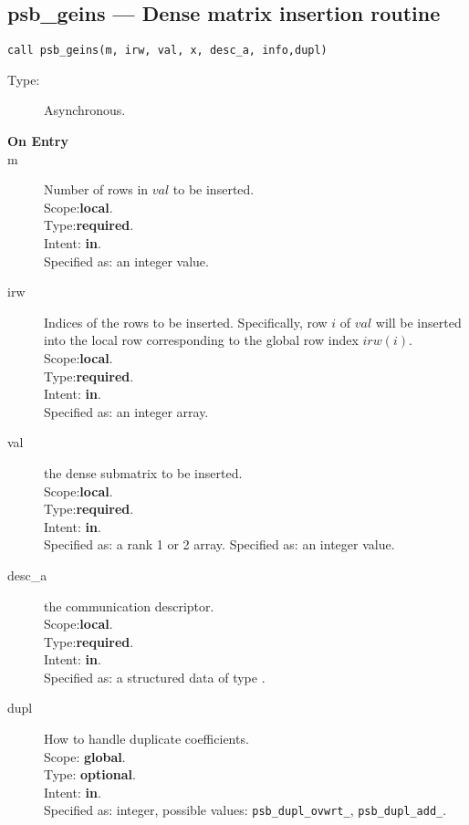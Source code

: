 %
%
\clearpage\subsection*{psb\_geins --- Dense matrix insertion routine}

\begin{verbatim}
call psb_geins(m, irw, val, x, desc_a, info,dupl)
\end{verbatim}

\begin{description}
\item[Type:] Asynchronous.
\item[\bf On Entry]
\item[m] Number of rows in $val$  to be inserted.\\
Scope:{\bf local}.\\
Type:{\bf required}.\\
Intent: {\bf in}.\\
Specified as: an integer value.
\item[irw] Indices of the rows to be inserted. Specifically, row $i$
  of $val$ will be inserted into the local row corresponding to the
  global row index $irw(i)$.
Scope:{\bf local}.\\
Type:{\bf required}.\\
Intent: {\bf in}.\\
Specified as: an integer array.
\item[val] the dense submatrix to be inserted.\\
Scope:{\bf local}.\\
Type:{\bf required}.\\
Intent: {\bf in}.\\
Specified as: a rank 1 or 2  array.
Specified as: an integer value.
\item[desc\_a] the communication descriptor.\\
Scope:{\bf local}.\\
Type:{\bf required}.\\
Intent: {\bf in}.\\
Specified as: a structured data of type \descdata.
\item[dupl] How to handle duplicate coefficients.\\
Scope: {\bf global}.\\
Type: {\bf optional}.\\
Intent: {\bf in}.\\
Specified as: integer, possible values: \verb|psb_dupl_ovwrt_|,
\verb|psb_dupl_add_|.
\end{description}

